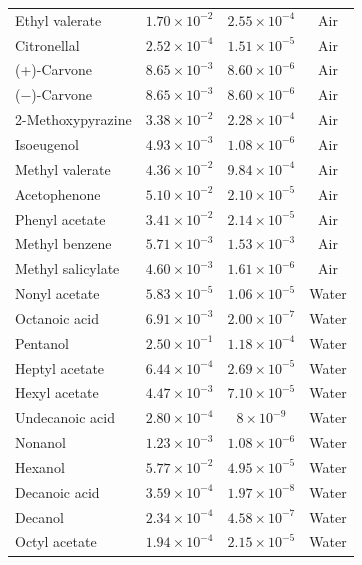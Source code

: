\documentclass[%
 twocolumn,
 amsmath,amssymb,
 aps,prfluids,
 superscriptaddress,
]{revtex4-2}
\begin{document}
\begin{table}[t]
\begin{ruledtabular}
\begin{tabular}{l c c c}
Ethyl valerate       & $1.70\times 10^{-2}$  & $2.55\times 10^{-4}$ & Air   \\
Citronellal          & $2.52\times 10^{-4}$  & $1.51\times 10^{-5}$ & Air   \\
(+)-Carvone          & $8.65\times 10^{-3}$  & $8.60\times 10^{-6}$ & Air   \\
($-$)-Carvone        & $8.65\times 10^{-3}$  & $8.60\times 10^{-6}$ & Air   \\
2-Methoxypyrazine    & $3.38\times 10^{-2}$  & $2.28\times 10^{-4}$ & Air   \\
Isoeugenol           & $4.93\times 10^{-3}$  & $1.08\times 10^{-6}$ & Air \\
Methyl valerate      & $4.36\times 10^{-2}$  & $9.84\times 10^{-4}$ & Air   \\
Acetophenone         & $5.10\times 10^{-2}$  & $2.10\times 10^{-5}$ & Air   \\
Phenyl acetate       & $3.41\times 10^{-2}$  & $2.14\times 10^{-5}$ & Air   \\
Methyl benzene       & $5.71\times 10^{-3}$  & $1.53\times 10^{-3}$ & Air   \\
Methyl salicylate    & $4.60\times 10^{-3}$  & $1.61\times 10^{-6}$ & Air   \\
Nonyl acetate        & $5.83\times 10^{-5}$  & $1.06\times 10^{-5}$ & Water \\
Octanoic acid        & $6.91\times 10^{-3}$  & $2.00\times 10^{-7}$ & Water \\
Pentanol             & $2.50\times 10^{-1}$  & $1.18\times 10^{-4}$ & Water   \\
Heptyl acetate       & $6.44\times 10^{-4}$  & $2.69\times 10^{-5}$ & Water \\
Hexyl acetate        & $4.47\times 10^{-3}$  & $7.10\times 10^{-5}$ & Water \\
Undecanoic acid      & $2.80\times 10^{-4}$ & $8\times 10^{-9}$  & Water \\
Nonanol              & $1.23\times 10^{-3}$  & $1.08\times 10^{-6}$ & Water   \\
Hexanol              & $5.77\times 10^{-2}$  & $4.95\times 10^{-5}$ & Water \\
Decanoic acid        & $3.59\times 10^{-4}$  & $1.97\times 10^{-8}$ & Water \\
Decanol              & $2.34\times 10^{-4}$  & $4.58\times 10^{-7}$ & Water   \\
Octyl acetate        & $1.94\times 10^{-4}$  & $2.15\times 10^{-5}$ & Water \\

\end{tabular}
\end{ruledtabular}
\end{table}
\end{document}
